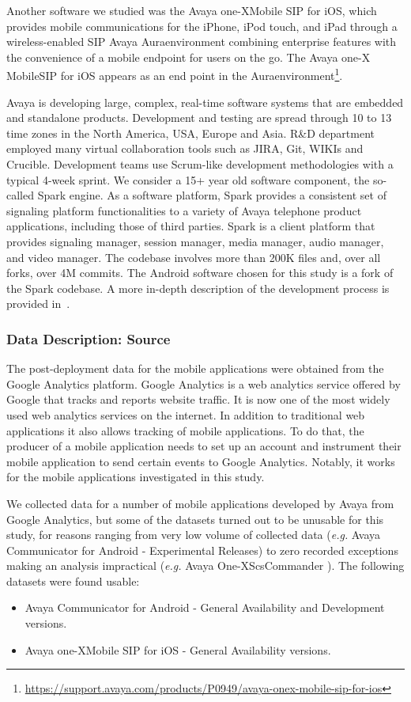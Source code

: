 \documentclass[smallcondensed]{svjour3}     %
\begin{document}
Another software we studied was the Avaya one-X\textregistered Mobile  SIP for  iOS, which provides mobile communications for the iPhone, iPod touch, and iPad through a wireless-enabled SIP Avaya Aura\textregistered environment combining enterprise features with the convenience of a mobile endpoint for users on the go. The Avaya one-X Mobile\textregistered SIP for iOS appears as an end point in the Aura\textregistered environment\footnote{\url{https://support.avaya.com/products/P0949/avaya-onex-mobile-sip-for-ios}}.

Avaya is developing large, complex, real-time software systems that
are embedded and standalone products. Development and testing are
spread through 10 to 13 time zones in the North America, USA, Europe
and Asia. R\&D department employed many virtual collaboration tools
such as JIRA, Git, WIKIs and Crucible. Development teams use
Scrum-like development methodologies with a typical 4-week
sprint. We consider a 15+ year old software component, the so-called
Spark engine.  As a software platform, Spark provides a consistent
set of signaling platform functionalities to a variety of Avaya
telephone product applications, including those of third parties.
Spark is a client platform that provides signaling manager, session
manager, media manager, audio manager, and video manager. The
codebase involves more than 200K files and, over all forks, over 4M
commits.  The Android software chosen for this study is a fork of
the Spark codebase. A more in-depth description of the development
process is provided in~\cite{amhp14}.

\subsubsection{Data Description: Source}
The post-deployment data for the mobile applications were obtained from the 
Google Analytics platform.
Google Analytics is a web analytics service offered by
Google that tracks and reports website traffic. It is now one of the most
widely used web analytics services on the internet. In addition to
traditional web applications it also allows tracking of mobile
applications. To do that, the producer of a mobile application needs
to set up an account and instrument their mobile application to send certain
events to Google Analytics. Notably, it works for the mobile
applications investigated in this study. 

We collected data for a number of mobile applications developed by Avaya from Google Analytics, but some of the datasets turned out to be unusable for this study, for reasons ranging from very low volume of collected data (\textit{e.g.} Avaya Communicator for Android - Experimental Releases) to zero recorded exceptions making an analysis impractical (\textit{e.g.} Avaya One-X\textregistered   ScsCommander ). The following datasets were found usable:
\begin{itemize}
    \item Avaya Communicator for Android - General Availability and Development versions.
    \item Avaya one-X\textregistered Mobile  SIP for  iOS - General Availability versions.
\end{itemize}
\end{document}
